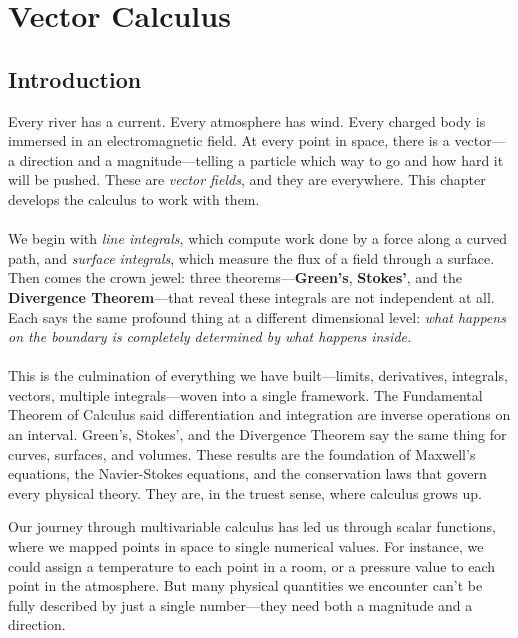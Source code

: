 
\chapter{Vector Calculus}

\section*{Introduction}

Every river has a current. Every atmosphere has wind. Every charged body is immersed in an electromagnetic field. At every point in space, there is a vector---a direction and a magnitude---telling a particle which way to go and how hard it will be pushed. These are \textit{vector fields}, and they are everywhere. This chapter develops the calculus to work with them.\\ \\
\noindent We begin with \textit{line integrals}, which compute work done by a force along a curved path, and \textit{surface integrals}, which measure the flux of a field through a surface. Then comes the crown jewel: three theorems---\textbf{Green's}, \textbf{Stokes'}, and the \textbf{Divergence Theorem}---that reveal these integrals are not independent at all. Each says the same profound thing at a different dimensional level: \textit{what happens on the boundary is completely determined by what happens inside.}\\ \\
\noindent This is the culmination of everything we have built---limits, derivatives, integrals, vectors, multiple integrals---woven into a single framework. The Fundamental Theorem of Calculus said differentiation and integration are inverse operations on an interval. Green's, Stokes', and the Divergence Theorem say the same thing for curves, surfaces, and volumes. These results are the foundation of Maxwell's equations, the Navier-Stokes equations, and the conservation laws that govern every physical theory. They are, in the truest sense, where calculus grows up.

\newpage 





  

\noindent Our journey through multivariable calculus has led us through scalar functions, where we mapped points in space to single numerical values. For instance, we could assign a temperature to each point in a room, or a pressure value to each point in the atmosphere. But many physical quantities we encounter can't be fully described by just a single number—they need both a magnitude and a direction. \\

